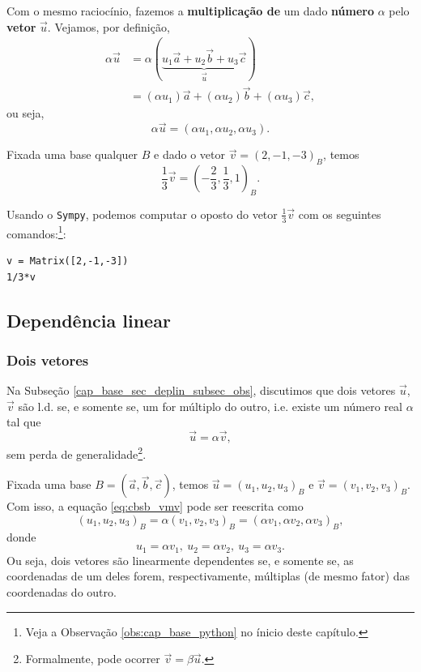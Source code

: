 Com o mesmo raciocínio, fazemos a {\bf multiplicação de} um dado {\bf número} $\alpha$ pelo {\bf vetor} $\vec{u}$. Vejamos, por definição,
\begin{align}
  \alpha\vec{u} &= \alpha(\underbrace{u_1\vec{a} + u_2\vec{b} + u_3\vec{c}}_{\vec{u}})\\
                &= (\alpha u_1)\vec{a} + (\alpha u_2)\vec{b} + (\alpha u_3)\vec{c},
\end{align}
ou seja,
\begin{equation}
  \alpha\vec{u} = (\alpha u_1,\alpha u_2, \alpha u_3).
\end{equation}

\begin{ex}
  Fixada uma base qualquer $B$ e dado o vetor $\vec{v} = (2, -1, -3)_B$, temos
  \begin{equation}
    \frac{1}{3}\vec{v} = \left(-\frac{2}{3}, \frac{1}{3}, 1\right)_B.
  \end{equation}

    \ifispython
  Usando o \verb+Sympy+, podemos computar o oposto do vetor $\frac{1}{3}\vec{v}$ com os seguintes comandos:\footnote{Veja a Observação \ref{obs:cap_base_python} no ínicio deste capítulo.}:
\begin{verbatim}
v = Matrix([2,-1,-3])
1/3*v
\end{verbatim}
  \fi

\end{ex}

\subsection{Dependência linear}

\subsubsection{Dois vetores}

Na Subseção \ref{cap_base_sec_deplin_subsec_obs}, discutimos que dois vetores $\vec{u}$, $\vec{v}$ são l.d. se, e somente se, um for múltiplo do outro, i.e. existe um número real $\alpha$ tal que
\begin{equation}\label{eq:cbsb_vmv}
  \vec{u} = \alpha\vec{v},
\end{equation}
sem perda de generalidade\footnote{Formalmente, pode ocorrer $\vec{v} = \beta\vec{u}$.}.

Fixada uma base $B = (\vec{a}, \vec{b}, \vec{c})$, temos $\vec{u} = (u_1, u_2, u_3)_B$ e $\vec{v} = (v_1, v_2, v_3)_B$. Com isso, a equação \eqref{eq:cbsb_vmv} pode ser reescrita como
\begin{equation}
  (u_1, u_2, u_3)_B = \alpha(v_1, v_2, v_3)_B = (\alpha v_1, \alpha v_2, \alpha v_3)_B,
\end{equation}
donde
\begin{equation}
  u_1 = \alpha v_1,~u_2 = \alpha v_2,~u_3 = \alpha v_3.
\end{equation}
Ou seja, dois vetores são linearmente dependentes se, e somente se, as coordenadas de um deles forem, respectivamente, múltiplas (de mesmo fator) das coordenadas do outro.

